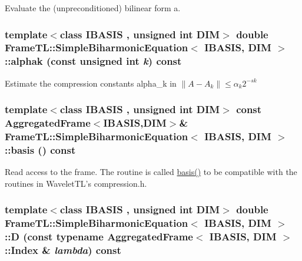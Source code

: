 Evaluate the (unpreconditioned) bilinear form a. \hypertarget{classFrameTL_1_1SimpleBiharmonicEquation_d7aedcf83a6ee9d35ec8086eb9d7a528}{
\subsubsection[{alphak}]{\setlength{\rightskip}{0pt plus 5cm}template$<$class IBASIS , unsigned int DIM$>$ double {\bf FrameTL::SimpleBiharmonicEquation}$<$ IBASIS, DIM $>$::alphak (const unsigned int {\em k}) const}}
\label{classFrameTL_1_1SimpleBiharmonicEquation_d7aedcf83a6ee9d35ec8086eb9d7a528}


Estimate the compression constants alpha\_\-k in $\|A-A_k\| \leq \alpha_k 2^{-sk}$ \hypertarget{classFrameTL_1_1SimpleBiharmonicEquation_27aa32bf09583eaccb85c02a83ace799}{
\subsubsection[{basis}]{\setlength{\rightskip}{0pt plus 5cm}template$<$class IBASIS , unsigned int DIM$>$ const {\bf AggregatedFrame}$<$IBASIS,DIM$>$\& {\bf FrameTL::SimpleBiharmonicEquation}$<$ IBASIS, DIM $>$::basis () const}}
\label{classFrameTL_1_1SimpleBiharmonicEquation_27aa32bf09583eaccb85c02a83ace799}


Read access to the frame. The routine is called \hyperlink{classFrameTL_1_1SimpleBiharmonicEquation_27aa32bf09583eaccb85c02a83ace799}{basis()} to be compatible with the routines in WaveletTL's compression.h. \hypertarget{classFrameTL_1_1SimpleBiharmonicEquation_0b1b68d78e17e9686b8feb3b899b572f}{
\subsubsection[{D}]{\setlength{\rightskip}{0pt plus 5cm}template$<$class IBASIS , unsigned int DIM$>$ double {\bf FrameTL::SimpleBiharmonicEquation}$<$ IBASIS, DIM $>$::D (const typename {\bf AggregatedFrame}$<$ IBASIS, DIM $>$::{\bf Index} \& {\em lambda}) const}}
\label{classFrameTL_1_1SimpleBiharmonicEquation_0b1b68d78e17e9686b8feb3b899b572f}


